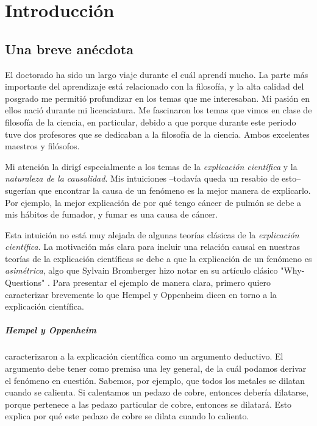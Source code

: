 ﻿%

\chapter{Introducción}

\section{Una breve anécdota}

\noindent El doctorado ha sido un largo viaje durante el cuál
aprendí mucho. La parte más importante del aprendizaje está
relacionado con la filosofía, y la alta calidad del posgrado me permitió profundizar en los temas que me interesaban. Mi pasión en ellos nació durante mi licenciatura. Me fascinaron los temas que vimos en clase de  filosofía de la ciencia, en particular, debido a que porque durante este periodo tuve dos profesores que se dedicaban a la filosofía de la ciencia. Ambos excelentes maestros y filósofos.

Mi atención la dirigí especialmente a los temas de la
\emph{explicación científica} y la \emph{naturaleza de la
causalidad}. Mis intuiciones --todavía queda un resabio de esto--
sugerían que encontrar la causa de un fenómeno es la mejor manera de
explicarlo. Por ejemplo, la mejor explicación de por qué tengo cáncer
de pulmón se debe a mis hábitos de fumador, y fumar es una causa de
cáncer.

Esta intuición no está muy alejada de algunas teorías clásicas de la
\textit{explicación científica}. La motivación más clara para
incluir una relación causal en nuestras teorías de la explicación
científicas se debe a que la explicación de un fenómeno es
\textit{asimétrica}, algo que Sylvain Bromberger hizo notar en su
artículo clásico "Why-Questions" \cite{Bromberger1966-BROW-2}.
Para presentar el ejemplo de manera clara, primero quiero
caracterizar brevemente lo que Hempel y Oppenheim dicen en torno a
la explicación científica.

\paragraph{Hempel y Oppenheim \citeyear{Hempel1948}} caracterizaron
a la explicación científica como un argumento deductivo. El argumento
debe tener como premisa una ley general, de la cuál podamos derivar
el fenómeno en cuestión. Sabemos, por ejemplo, que todos los metales
se dilatan cuando se calienta. Si calentamos un pedazo de cobre,
entonces debería dilatarse, porque pertenece a las  pedazo
particular de cobre, entonces se dilatará. Esto explica por qué este
pedazo de cobre se dilata cuando lo caliento.

